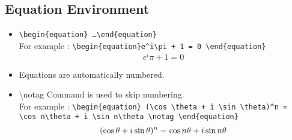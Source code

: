 \documentclass{article}
\begin{document}
\subsection{Equation Environment}
\begin{itemize}
	\item \texttt{\textbackslash{}begin\{equation\} \dots \textbackslash{}end\{equation\}}\\ For example : \texttt{\textbackslash{}begin\{equation\}e\^{}i\textbackslash{}pi + 1 = 0 \textbackslash{}end\{equation\}} \begin{equation} e^i\pi + 1 = 0 \end{equation} 
	\item Equations are automatically numbered.
	\item \textbackslash{}notag Command is used to skip numbering. \\ For example : \texttt{\textbackslash{}begin\{equation\} (\textbackslash{}cos \textbackslash{}theta + i \textbackslash{}sin \textbackslash{}theta)\^{}n = \textbackslash{}cos n\textbackslash{}theta + i \textbackslash{}sin n\textbackslash{}theta \textbackslash{}notag \textbackslash{}end\{equation\}} \begin{equation} (\cos \theta + i \sin \theta)^n = \cos n\theta + i \sin n\theta \notag \end{equation}
\end{itemize}
\end{document}
